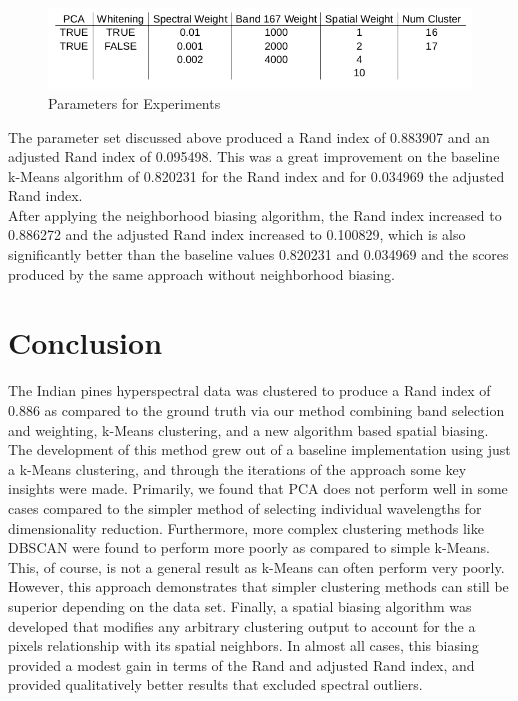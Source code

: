 \documentclass[journal]{IEEEtran}
\begin{document}
  \begin{figure}[h!]
    \centering\includegraphics[width=\columnwidth]{images/parameters.png}
    \caption{Parameters for Experiments}
    \label{fig:Parameters}
  \end{figure}

  The parameter set discussed above produced a Rand index of 0.883907 and an adjusted Rand index of 0.095498. This was a great improvement on the baseline k-Means algorithm of 0.820231 for the Rand index and for 0.034969 the adjusted Rand index.\\

  After applying the neighborhood biasing algorithm, the Rand index increased to 0.886272 and the adjusted Rand index increased to 0.100829, which is also significantly better than the baseline values 0.820231 and 0.034969 and the scores produced by the same approach without neighborhood biasing.\\


\section{Conclusion}
  The Indian pines hyperspectral data was clustered to produce a Rand index of 0.886 as compared to the ground truth via our method combining band selection and weighting, k-Means clustering, and a new algorithm based spatial biasing. The development of this method grew out of a baseline implementation using just a k-Means clustering, and through the iterations of the approach some key insights were made. Primarily, we found that PCA does not perform well in some cases compared to the simpler method of selecting individual wavelengths for dimensionality reduction. Furthermore, more complex clustering methods like DBSCAN were found to perform more poorly as compared to simple k-Means. This, of course, is not a general result as k-Means can often perform very poorly. However, this approach demonstrates that simpler clustering methods can still be superior depending on the data set. Finally, a spatial biasing algorithm was developed that modifies any arbitrary clustering output to account for the a pixels relationship with its spatial neighbors. In almost all cases, this biasing provided a modest gain in terms of the Rand and adjusted Rand index, and provided qualitatively better results that excluded spectral outliers.\\
\end{document}
